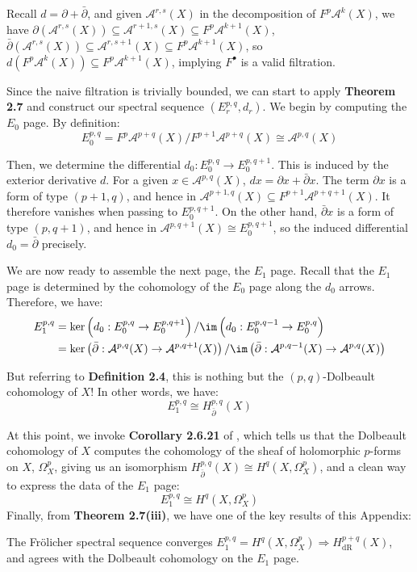 \noindent Recall $d=\partial + \bar\partial$, and given $\mathcal{A}^{r,s}(X)$ in the decomposition of $F^p\mathcal{A}^k(X)$, we have $\partial\left(\mathcal{A}^{r,s}(X)\right) \subseteq \mathcal{A}^{r+1,s}(X) \subseteq F^p \mathcal{A}^{k+1}(X)$, $\bar\partial\left(\mathcal{A}^{r,s}(X)\right) \subseteq \mathcal{A}^{r,s+1}(X) \subseteq F^p \mathcal{A}^{k+1}(X)$, so $d\left(F^p\mathcal{A}^k(X)\right) \subseteq F^p \mathcal{A}^{k+1}(X)$, implying $F^\bullet$ is a valid filtration. 

\medskip

\noindent Since the naive filtration is trivially bounded, we can start to apply \textbf{Theorem 2.7} and construct our spectral sequence $\left(E_r^{p,q}, d_r\right)$. We begin by computing the $E_0$ page. By definition:
$$
E_0^{p,q} = F^p\mathcal{A}^{p+q}(X) / F^{p+1}\mathcal{A}^{p+q}(X) \cong  \mathcal{A}^{p,q}(X)
$$

\noindent Then, we determine the differential $d_0:E_0^{p,q} \to E_0^{p,q+1}$. This is induced by the exterior derivative $d$. For a given $x\in \mathcal{A}^{p,q}(X)$, $dx = \partial x  + \bar\partial x$. The term $\partial x$ is a form of type $(p+1,q)$, and hence in $\mathcal{A}^{p+1,q}(X) \subseteq F^{p+1}\mathcal{A}^{p+q+1}(X)$. It therefore vanishes when passing to $E_0^{p,q+1}$. On the other hand, $\bar\partial x$ is a form of type $(p,q+1)$, and hence in $\mathcal{A}^{p,q+1}(X) \cong E_0^{p,q+1}$, so the induced differential $d_0 = \bar\partial$ precisely. 

\medskip

\noindent We are now ready to assemble the next page, the $E_1$ page. Recall that the $E_1$ page is determined by the cohomology of the $E_0$ page along the $d_0$ arrows. Therefore, we have:
\begin{align*}
E_1^{p,q} &= \ker \left(d_0:E_0^{p,q} \to E_0^{p,q+1}\right) / \im \left(d_0: E_0^{p,q-1}\to E_0^{p,q}\right) \\
&= \ker\left(\bar\partial: \mathcal{A}^{p,q}(X)\to \mathcal{A}^{p,q+1}(X) \right) / \im \left(\bar\partial: \mathcal{A}^{p,q-1}(X)\to \mathcal{A}^{p,q}(X) \right)
\end{align*}

\noindent But referring to \textbf{Definition 2.4}, this is nothing but the $(p,q)$-Dolbeault cohomology of $X$! In other words, we have:
$$
E_1^{p,q} \cong H_{\bar\partial}^{p,q}(X)
$$

\noindent At this point, we invoke \textbf{Corollary 2.6.21} of \cite{Huybrechts2005}, which tells us that the Dolbeault cohomology of $X$ computes the cohomology of the sheaf of holomorphic $p$-forms on $X$, $\Omega_X^p$, giving us an isomorphism $H_{\bar\partial}^{p,q}(X)\cong H^q\left(X,\Omega_X^p\right)$, and a clean way to express the data of the $E_1$ page:
$$
E_1^{p,q} \cong H^q\left(X,\Omega_X^p\right)
$$
Finally, from \textbf{Theorem 2.7(iii)}, we have one of the key results of this Appendix:
\begin{theorem}
    The Fr\"olicher spectral sequence converges $E_1^{p,q} = H^q\left(X,\Omega_X^p\right) \Rightarrow H^{p+q}_\mathrm{dR}(X)$, and agrees with the Dolbeault cohomology on the $E_1$ page. 
\end{theorem}

